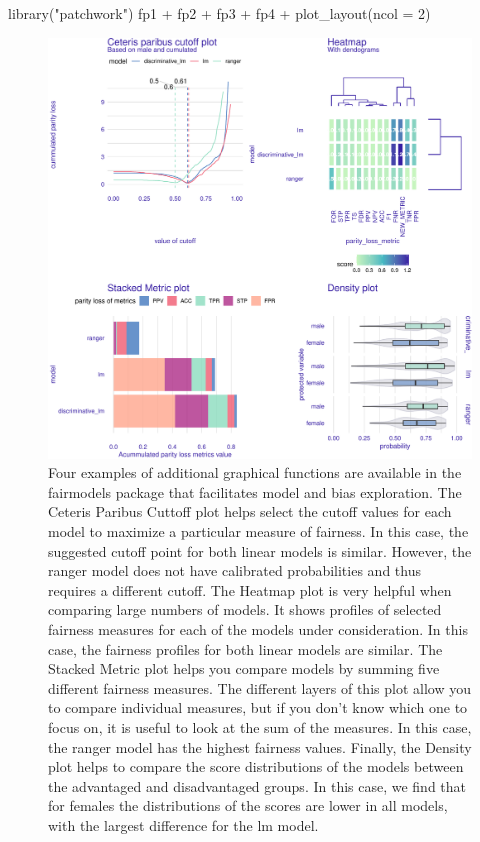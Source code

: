 \begin{Schunk}
\begin{Sinput}
library("patchwork")
fp1 + fp2 + fp3 + fp4 + 
  plot_layout(ncol = 2)
\end{Sinput}
\begin{figure}

{\centering \includegraphics[width=1\linewidth]{Wisniewski-Biecek_files/figure-latex/all-1} 

}

\caption[Four examples of additional graphical functions are available in the fairmodels package that facilitates model and bias exploration]{Four examples of additional graphical functions are available in the fairmodels package that facilitates model and bias exploration. The Ceteris Paribus Cuttoff plot helps select the cutoff values for each model to maximize a particular measure of fairness. In this case, the suggested cutoff point for both linear models is similar. However, the ranger model does not have calibrated probabilities and thus requires a different cutoff. The Heatmap plot is very helpful when comparing large numbers of models. It shows profiles of selected fairness measures for each of the models under consideration. In this case, the fairness profiles for both linear models are similar. The Stacked Metric plot helps you compare models by summing five different fairness measures. The different layers of this plot allow you to compare individual measures, but if you don't know which one to focus on, it is useful to look at the sum of the measures. In this case, the ranger model has the highest fairness values. Finally, the Density plot helps to compare the score distributions of the models between the advantaged and disadvantaged groups. In this case, we find that for females the distributions of the scores are lower in all models, with the largest difference for the lm model. }\label{fig:all}
\end{figure}
\end{Schunk}

